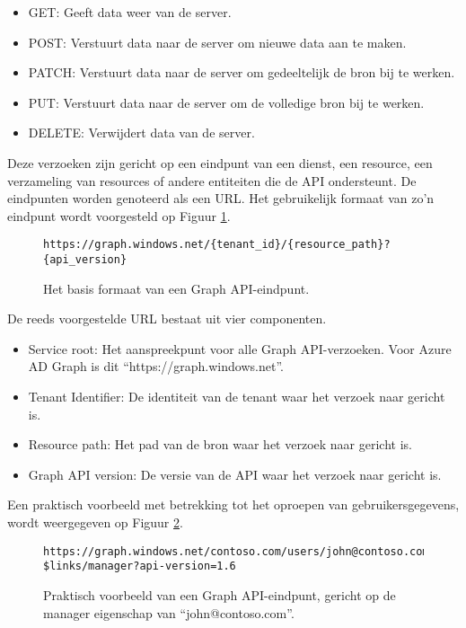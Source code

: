 \begin{itemize}
    \item GET: Geeft data weer van de server.
    \item POST: Verstuurt data naar de server om nieuwe data aan te maken.
    \item PATCH: Verstuurt data naar de server om gedeeltelijk de bron bij te werken.
    \item PUT: Verstuurt data naar de server om de volledige bron bij te werken.
    \item DELETE: Verwijdert data van de server.
\end{itemize}

Deze verzoeken zijn gericht op een eindpunt van een dienst, een resource, een verzameling van resources of andere entiteiten die de \ac{API} ondersteunt. De eindpunten worden genoteerd als een \ac{URL}. Het gebruikelijk formaat van zo'n eindpunt wordt voorgesteld op Figuur \ref{bfe}. \\

\begin{figure}[h]
    \footnotesize\begin{verbatim}https://graph.windows.net/{tenant_id}/{resource_path}?{api_version}
    \end{verbatim}    
    \caption[Basis formaat Graph API-eindpunt]{Het basis formaat van een Graph \ac{API}-eindpunt.}
    \label{bfe}
\end{figure}

De reeds voorgestelde \ac{URL} bestaat uit vier componenten.

\begin{itemize}
    \item Service root: Het aanspreekpunt voor alle Graph \ac{API}-verzoeken. Voor Azure \ac{AD} Graph is dit “https://graph.windows.net”.
    \item Tenant Identifier: De identiteit van de tenant waar het verzoek naar gericht is.
    \item Resource path: Het pad van de bron waar het verzoek naar gericht is.
    \item Graph \ac{API} version: De versie van de \ac{API} waar het verzoek naar gericht is.
\end{itemize}

Een praktisch voorbeeld met betrekking tot het oproepen van gebruikersgegevens, wordt weergegeven op Figuur \ref{pfe}. \\

\begin{figure}[h]
    \footnotesize\begin{verbatim}https://graph.windows.net/contoso.com/users/john@contoso.com/
$links/manager?api-version=1.6
    \end{verbatim}    
    \caption[Voorbeeld Graph API-eindpunt]{Praktisch voorbeeld van een Graph \ac{API}-eindpunt, gericht op de manager eigenschap van “john@contoso.com”.}
    \label{pfe}
\end{figure}



